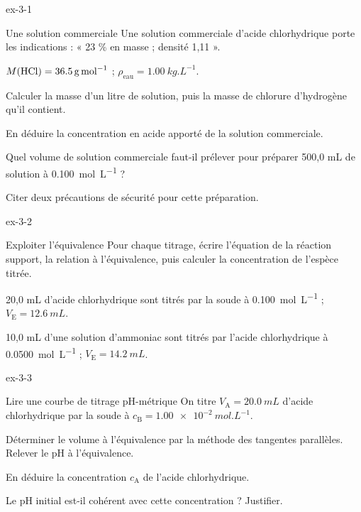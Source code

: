 \begin{blocLivre}{ex-3-1}
\begin{exercice}[1]{Une solution commerciale}
Une solution commerciale d'acide chlorhydrique porte les indications : « 23 \% en masse ; densité 1,11 ».
\begin{donnees}
$M(\ce{HCl})=\qty{36,5}{g.mol^{-1}}$ ; $\rho_\text{eau}=\qty{1,00}{kg.L^{-1}}$.
\end{donnees}
\begin{questions}
\item Calculer la masse d'un litre de solution, puis la masse de chlorure d'hydrogène qu'il contient.
\item En déduire la concentration en acide apporté de la solution commerciale.
\item Quel volume de solution commerciale faut-il prélever pour préparer 500,0 mL de solution à \qty{0,100}{mol.L^{-1}} ?
\item Citer deux précautions de sécurité pour cette préparation.
\end{questions}
\end{exercice}
\end{blocLivre}
\begin{blocLivre}{ex-3-2}
\begin{exercice}[1]{Exploiter l'équivalence}
Pour chaque titrage, écrire l'équation de la réaction support, la relation à l'équivalence, puis calculer la
concentration de l'espèce titrée.
\begin{questions}
\item 20,0 mL d'acide chlorhydrique sont titrés par la soude à \qty{0,100}{mol.L^{-1}} ; $V_\mathrm{E}=\qty{12,6}{mL}$.
\item 10,0 mL d'une solution d'ammoniac  sont titrés par l'acide chlorhydrique à \qty{0,0500}{mol.L^{-1}} ;
$V_\mathrm{E}=\qty{14,2}{mL}$.
\end{questions}
\end{exercice}
\end{blocLivre}
\begin{blocLivre}{ex-3-3}
\begin{exercice}[1]{Lire une courbe de titrage pH-métrique}
On titre $V_\mathrm{A}=\qty{20,0}{mL}$ d'acide chlorhydrique par la soude à $c_\mathrm{B}=\qty{1,00e-2}{mol.L^{-1}}$.
\begin{questions}
\item Déterminer le volume à l'équivalence par la méthode des tangentes parallèles. Relever le pH à l'équivalence.
\item En déduire la concentration $c_\mathrm{A}$ de l'acide chlorhydrique.
\item Le pH initial est-il cohérent avec cette concentration ? Justifier.
\end{questions}
\end{exercice}
\end{blocLivre}
